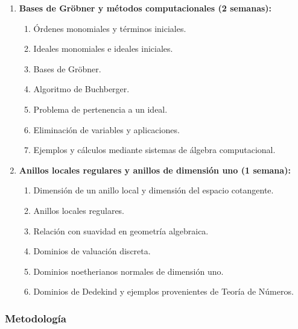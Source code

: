 \begin{refsection}
\begin{enumerate}
\item \textbf{Bases de Gröbner y métodos computacionales (2 semanas):}
\begin{enumerate}
    \item Órdenes monomiales y términos iniciales.
    \item Ideales monomiales e ideales iniciales.
    \item Bases de Gröbner.
    \item Algoritmo de Buchberger.
    \item Problema de pertenencia a un ideal.
    \item Eliminación de variables y aplicaciones.
    \item Ejemplos y cálculos mediante sistemas de álgebra computacional.
\end{enumerate}

\item \textbf{Anillos locales regulares y anillos de dimensión uno (1 semana):}
\begin{enumerate}
    \item Dimensión de un anillo local y dimensión del espacio cotangente.
    \item Anillos locales regulares.
    \item Relación con suavidad en geometría algebraica.
    \item Dominios de valuación discreta.
    \item Dominios noetherianos normales de dimensión uno.
    \item Dominios de Dedekind y ejemplos provenientes de Teoría de Números.
\end{enumerate}

\end{enumerate}


\subsubsection*{Metodología}


\end{refsection}
